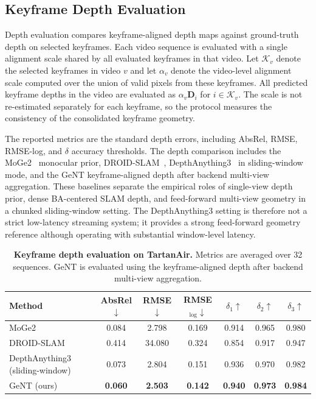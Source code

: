 \subsection{Keyframe Depth Evaluation}
Depth evaluation compares keyframe-aligned depth maps against ground-truth depth on selected keyframes.
Each video sequence is evaluated with a single alignment scale shared by all evaluated keyframes in that video.
Let $\mathcal{K}_v$ denote the selected keyframes in video $v$ and let $\alpha_v$ denote the video-level alignment scale computed over the union of valid pixels from these keyframes.
All predicted keyframe depths in the video are evaluated as $\alpha_v \bm{D}_i$ for $i\in\mathcal{K}_v$.
The scale is not re-estimated separately for each keyframe, so the protocol measures the consistency of the consolidated keyframe geometry.

The reported metrics are the standard depth errors, including AbsRel, RMSE, RMSE-log, and $\delta$ accuracy thresholds.
The depth comparison includes the MoGe2~\cite{wang2025moge2} monocular prior, DROID-SLAM~\cite{teed2021droid}, DepthAnything3~\cite{lin2026depth} in sliding-window mode, and the GeNT keyframe-aligned depth after backend multi-view aggregation.
These baselines separate the empirical roles of single-view depth prior, dense BA-centered SLAM depth, and feed-forward multi-view geometry in a chunked sliding-window setting.
The DepthAnything3 setting is therefore not a strict low-latency streaming system; it provides a strong feed-forward geometry reference although operating with substantial window-level latency.

\begin{table}[!t]
    \centering
    \caption{\textbf{Keyframe depth evaluation on TartanAir.}
    Metrics are averaged over 32 sequences.
    GeNT is evaluated using the keyframe-aligned depth after backend multi-view aggregation.}
    \label{tab:geont_depth_eval}
    \small
    \setlength{\tabcolsep}{5pt}
    \renewcommand{\arraystretch}{1.12}
    \begin{tabular*}{\textwidth}{@{\extracolsep{\fill}}lcccccc@{}}
        \toprule
        \textbf{Method} &
        \textbf{AbsRel}$\downarrow$ &
        \textbf{RMSE}$\downarrow$ &
        \textbf{RMSE$_{\log}$}$\downarrow$ &
        \textbf{$\delta_1$}$\uparrow$ &
        \textbf{$\delta_2$}$\uparrow$ &
        \textbf{$\delta_3$}$\uparrow$ \\
        \midrule
        MoGe2~\cite{wang2025moge2} & 0.084 & 2.798 & 0.169 & 0.914 & 0.965 & 0.980 \\
        DROID-SLAM~\cite{teed2021droid} & 0.414 & 34.080 & 0.324 & 0.854 & 0.917 & 0.947 \\
        DepthAnything3 (sliding-window)~\cite{lin2026depth} & 0.073 & 2.804 & 0.151 & 0.936 & 0.970 & 0.982 \\
        GeNT (ours) & \textbf{0.060} & \textbf{2.503} & \textbf{0.142} & \textbf{0.940} & \textbf{0.973} & \textbf{0.984} \\
        \bottomrule
    \end{tabular*}
\end{table}

